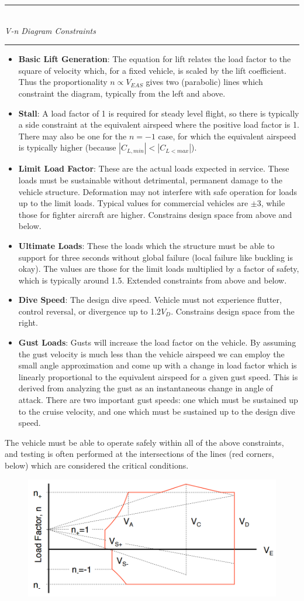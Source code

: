 \documentclass[11pt]{article}
\newcommand{\Item}[1]{\item \textbf{#1}:}
\newcommand{\Header}[1]{\noindent\rule{\textwidth}{0.4pt}\\[0.3cm]\indent \large{\textit{#1}}\normalsize{}\\[-0.1cm]\noindent\rule{\textwidth}{0.4pt}}
\begin{document}
\Header{V-n Diagram Constraints}
\begin{itemize}
\Item{Basic Lift Generation} The equation for lift relates the load factor to the square of velocity which, for a fixed vehicle, is scaled by the lift coefficient. Thus the proportionality $n\propto V_{EAS}$ gives two (parabolic) lines which constraint the diagram, typically from the left and above.
\Item{Stall} A load factor of 1 is required for steady level flight, so there is typically a side constraint at the equivalent airspeed where the positive load factor is 1. There may also be one for the $n=-1$ case, for which the equivalent airspeed is typically higher (because $|C_{L,min}|<|C_{L<max}|$).
\Item{Limit Load Factor} These are the actual loads expected in service. These loads must be sustainable without detrimental, permanent damage to the vehicle structure. Deformation may not interfere with safe operation for loads up to the limit loads. Typical values for commercial vehicles are $\pm3$, while those for fighter aircraft are higher. Constrains design space from above and below.
\Item{Ultimate Loads} These the loads which the structure must be able to support for three seconds without global failure (local failure like buckling is okay). The values are those for the limit loads multiplied by a factor of safety, which is typically around 1.5. Extended constraints from above and below.
\Item{Dive Speed} The design dive speed. Vehicle must not experience flutter, control reversal, or divergence up to 1.2$V_D$. Constrains design space from the right.
\Item{Gust Loads} Gusts will increase the load factor on the vehicle. By assuming the gust velocity is much less than the vehicle airspeed we can employ the small angle approximation and come up with a change in load factor which is linearly proportional to the equivalent airspeed for a given gust speed. This is derived from analyzing the gust as an instantaneous change in angle of attack. There are two important gust speeds: one which must be sustained up to the cruise velocity, and one which must be sustained up to the design dive speed.
\end{itemize}

The vehicle must be able to operate safely within all of the above constraints, and testing is often performed at the intersections of the lines (red corners, below) which are considered the critical conditions.
\begin{figure}[h]
\centering
\includegraphics[width=\textwidth]{Graphics/V-n.PNG}
\end{figure}
\end{document}
